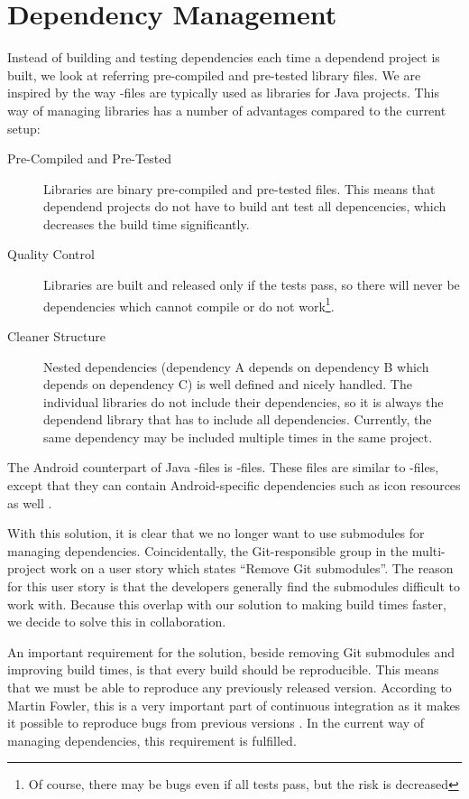 \section{Dependency Management}
Instead of building and testing dependencies each time a dependend project is built, we look at referring pre-compiled and pre-tested library files. We are inspired by the way -files are typically used as libraries for Java projects. This way of managing libraries has a number of advantages compared to the current setup:
\begin{description}
  \item [Pre-Compiled and Pre-Tested] Libraries are binary pre-compiled and pre-tested files. This means that dependend projects do not have to build ant test all depencencies, which decreases the build time significantly.
  \item[Quality Control] Libraries are built and released only if the tests pass, so there will never be dependencies which cannot compile or do not work\footnote{Of course, there may be bugs even if all tests pass, but the risk is decreased}.
  \item[Cleaner Structure] Nested dependencies (dependency A depends on dependency B which depends on dependency C) is well defined and nicely handled. The individual libraries do not include their dependencies, so it is always the dependend library that has to include all dependencies. Currently, the same dependency may be included multiple times in the same project.
\end{description}
The Android counterpart of Java -files is -files. These files are similar to -files, except that they can contain Android-specific dependencies such as icon resources as well \parencite{android-aar}.

With this solution, it is clear that we no longer want to use submodules for managing dependencies. Coincidentally, the Git-responsible group in the multi-project work on a user story which states ``Remove Git submodules''. The reason for this user story is that the developers generally find the submodules difficult to work with. Because this overlap with our solution to making build times faster, we decide to solve this in collaboration.

An important requirement for the solution, beside removing Git submodules and improving build times, is that every build should be reproducible. This means that we must be able to reproduce any previously released version. According to Martin Fowler, this is a very important part of continuous integration as it makes it possible to reproduce bugs from previous versions \parencite{fowlerReproducibleBuild}. In the current way of managing dependencies, this requirement is fulfilled.

